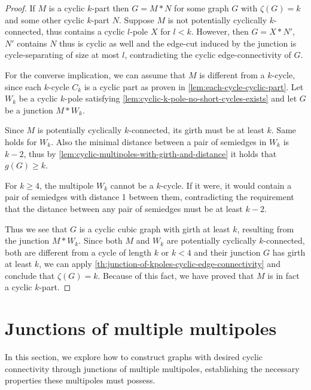 \documentclass[12pt, twoside]{book}
\begin{document}
\begin{proof}
	If $M$ is a cyclic $k$-part then $G=M*N$ for some graph $G$ with $\zeta(G)=k$ and some other cyclic $k$-part $N$. Suppose $M$ is not potentially cyclically \mbox{$k$-connected}, thus contains a cyclic $l$-pole $X$ for $l<k$. However, then $G=X*N'$, $N'$ contains $N$ thus is cyclic as well and the edge-cut induced by the junction is cycle-separating of size at most $l$, contradicting the cyclic edge-connectivity of $G$.
	
	For the converse implication, we can assume that $M$ is different from a $k$-cycle, since each $k$-cycle $C_k$ is a cyclic part as proven in \cref{lem:each-cycle-cyclic-part}. Let $W_k$ be a cyclic $k$-pole satisfying \cref{lem:cyclic-k-pole-no-short-cycles-exists} and let $G$ be a junction $M*W_k$.
	
	Since $M$ is potentially cyclically $k$-connected, its girth must be at least $k$. Same holds for $W_k$. Also the minimal distance between a pair of semiedges in $W_k$ is $k-2$, thus by \cref{lem:cyclic-multipoles-with-girth-and-distance} it holds that $g(G)\geq k$.
	
	For $k\geq 4$, the multipole $W_k$ cannot be a $k$-cycle. If it were, it would contain a pair of semiedges with distance 1 between them, contradicting the requirement that the distance between any pair of semiedges must be at least $k-2$.
	
	Thus we see that $G$ is a cyclic cubic graph with girth at least $k$, resulting from the junction ${M*W_k}$. Since both $M$ and $W_k$ are potentially cyclically \mbox{$k$-connected}, both are different from a cycle of length $k$ or $k<4$ and their junction $G$ has girth at least $k$, we can apply \cref{th:junction-of-kpoles-cyclic-edge-connectivity} and conclude that $\zeta(G)=k$. Because of this fact, we have proved that $M$ is in fact a cyclic $k$-part.
\end{proof}


\section{Junctions of multiple multipoles}\label{sec:junction-multiple-results}

In this section, we explore how to construct graphs with desired cyclic connectivity through junctions of multiple multipoles, establishing the necessary properties these multipoles must possess.
\end{document}
